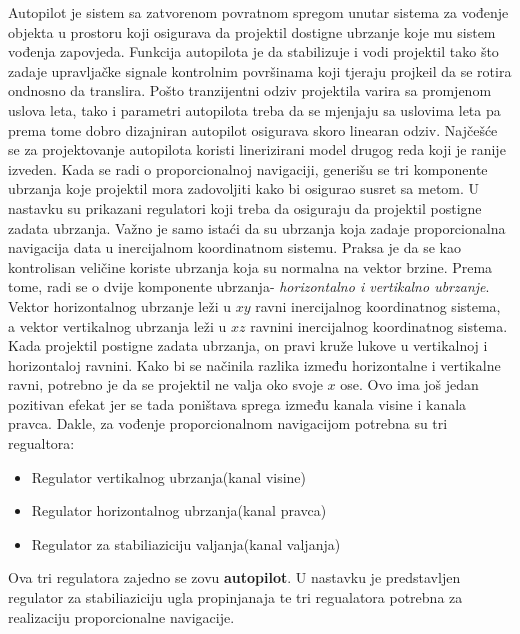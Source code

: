 Autopilot je sistem sa zatvorenom povratnom spregom unutar sistema za vođenje objekta 
u prostoru koji osigurava da projektil dostigne ubrzanje koje mu sistem vođenja zapovjeda. 
Funkcija autopilota je da stabilizuje i vodi projektil tako što zadaje upravljačke signale kontrolnim 
površinama koji tjeraju projkeil da se rotira ondnosno da translira.  
Pošto tranzijentni odziv projektila varira sa promjenom uslova leta, tako i parametri 
autopilota treba da se mjenjaju sa uslovima leta pa prema tome dobro 
dizajniran autopilot osigurava skoro linearan odziv. Najčešće se za projektovanje 
autopilota koristi linerizirani model drugog reda koji je ranije izveden. 
Kada se radi o proporcionalnoj navigaciji, generišu se tri komponente ubrzanja koje projektil mora 
zadovoljiti kako bi osigurao susret sa metom. U nastavku su prikazani regulatori koji 
treba da osiguraju da projektil postigne zadata ubrzanja. Važno je samo istaći 
da su ubrzanja koja zadaje proporcionalna navigacija data u inercijalnom koordinatnom sistemu. Praksa 
je da se kao kontrolisan veličine koriste ubrzanja koja su normalna na vektor brzine. Prema tome, 
radi se o dvije komponente ubrzanja- \textit{horizontalno i vertikalno ubrzanje}. Vektor horizontalnog ubrzanje 
leži u $xy$ ravni inercijalnog koordinatnog sistema, a vektor vertikalnog ubrzanja leži u $xz$ ravnini inercijalnog
koordinatnog sistema. Kada projektil postigne zadata ubrzanja, on pravi kruže lukove u vertikalnoj i 
horizontaloj ravnini. Kako bi se načinila razlika između horizontalne i vertikalne ravni, potrebno je 
da se projektil ne valja oko svoje $x$ ose. Ovo ima još jedan pozitivan efekat jer se tada poništava 
sprega između kanala visine i kanala pravca. Dakle, za vođenje proporcionalnom 
navigacijom potrebna su tri regualtora:
\begin{itemize}
    \item Regulator vertikalnog ubrzanja(kanal visine)
    \item Regulator horizontalnog ubrzanja(kanal pravca)
    \item Regulator za stabiliaziciju valjanja(kanal valjanja)
\end{itemize}
Ova tri regulatora zajedno se zovu \textbf{autopilot}. 
U nastavku je predstavljen regulator za stabiliaziciju ugla propinjanaja te tri regualatora potrebna 
za realizaciju proporcionalne navigacije. 
